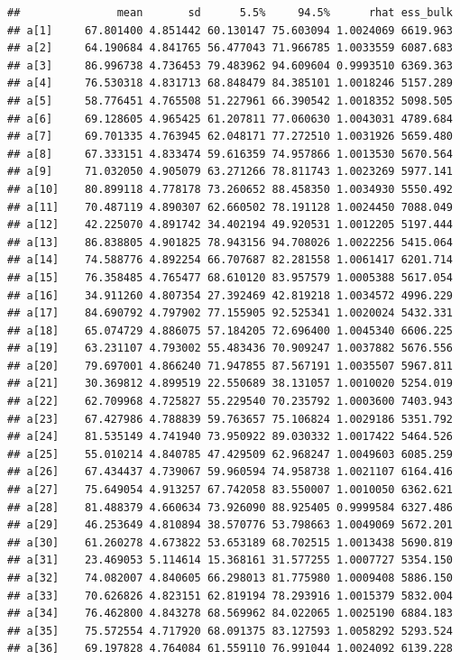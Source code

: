 \documentclass[
]{book}
\begin{document}
\begin{verbatim}
##               mean       sd      5.5%     94.5%      rhat ess_bulk
## a[1]     67.801400 4.851442 60.130147 75.603094 1.0024069 6619.963
## a[2]     64.190684 4.841765 56.477043 71.966785 1.0033559 6087.683
## a[3]     86.996738 4.736453 79.483962 94.609604 0.9993510 6369.363
## a[4]     76.530318 4.831713 68.848479 84.385101 1.0018246 5157.289
## a[5]     58.776451 4.765508 51.227961 66.390542 1.0018352 5098.505
## a[6]     69.128605 4.965425 61.207811 77.060630 1.0043031 4789.684
## a[7]     69.701335 4.763945 62.048171 77.272510 1.0031926 5659.480
## a[8]     67.333151 4.833474 59.616359 74.957866 1.0013530 5670.564
## a[9]     71.032050 4.905079 63.271266 78.811743 1.0023269 5977.141
## a[10]    80.899118 4.778178 73.260652 88.458350 1.0034930 5550.492
## a[11]    70.487119 4.890307 62.660502 78.191128 1.0024450 7088.049
## a[12]    42.225070 4.891742 34.402194 49.920531 1.0012205 5197.444
## a[13]    86.838805 4.901825 78.943156 94.708026 1.0022256 5415.064
## a[14]    74.588776 4.892254 66.707687 82.281558 1.0061417 6201.714
## a[15]    76.358485 4.765477 68.610120 83.957579 1.0005388 5617.054
## a[16]    34.911260 4.807354 27.392469 42.819218 1.0034572 4996.229
## a[17]    84.690792 4.797902 77.155905 92.525341 1.0020024 5432.331
## a[18]    65.074729 4.886075 57.184205 72.696400 1.0045340 6606.225
## a[19]    63.231107 4.793002 55.483436 70.909247 1.0037882 5676.556
## a[20]    79.697001 4.866240 71.947855 87.567191 1.0035507 5967.811
## a[21]    30.369812 4.899519 22.550689 38.131057 1.0010020 5254.019
## a[22]    62.709968 4.725827 55.229540 70.235792 1.0003600 7403.943
## a[23]    67.427986 4.788839 59.763657 75.106824 1.0029186 5351.792
## a[24]    81.535149 4.741940 73.950922 89.030332 1.0017422 5464.526
## a[25]    55.010214 4.840785 47.429509 62.968247 1.0049603 6085.259
## a[26]    67.434437 4.739067 59.960594 74.958738 1.0021107 6164.416
## a[27]    75.649054 4.913257 67.742058 83.550007 1.0010050 6362.621
## a[28]    81.488379 4.660634 73.926090 88.925405 0.9999584 6327.486
## a[29]    46.253649 4.810894 38.570776 53.798663 1.0049069 5672.201
## a[30]    61.260278 4.673822 53.653189 68.702515 1.0013438 5690.819
## a[31]    23.469053 5.114614 15.368161 31.577255 1.0007727 5354.150
## a[32]    74.082007 4.840605 66.298013 81.775980 1.0009408 5886.150
## a[33]    70.626826 4.823151 62.819194 78.293916 1.0015379 5832.004
## a[34]    76.462800 4.843278 68.569962 84.022065 1.0025190 6884.183
## a[35]    75.572554 4.717920 68.091375 83.127593 1.0058292 5293.524
## a[36]    69.197828 4.764084 61.559110 76.991044 1.0024092 6139.228

\end{verbatim}
\end{document}

